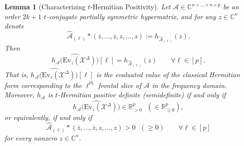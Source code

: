 \documentclass[11pt]{article}
\newtheorem{lemma}[theorem]{Lemma}
\begin{document}
\begin{lemma}[Characterizing $t$-Hermitian Positivity]\label{Characterizing t-Hermitian Positivity}
    Let $\mathcal{A}\in \mathbb{C}^{n\times\dots\times n\times p}$ be an order $2k+1$ $t$-conjugate partially symmetric hypermatrix, and for any $z\in \mathbb{C}^n$ denote 
    \[\widehat{\mathcal{A}}_{(\ell)}*(\overline{z},\dots,\overline{z},z,\dots,z) := h_{\widehat{\mathcal{A}}_{(\ell)}}(z).\]
    Then 
    \[\widehat{h_{\mathcal{A}}\big(\mathrm{Ev}_z(\mathcal{X}^{\Delta})\big)}[\ell] = h_{\widehat{\mathcal{A}}_{(\ell)}}(z)\qquad \forall \ell\in [p].\]
    That is, $\widehat{h_{\mathcal{A}}\big(\mathrm{Ev}_z(\mathcal{X}^{\Delta})\big)}[\ell]$ is the evaluated value of the classical Hermitian form corresponding to the $\ell^{th}$ frontal slice of $\mathcal{A}$ in the frequency domain. Moreover, $h_{\mathcal{A}}$ is $t$-Hermitian positive definite (semidefinite) if and only if  
    \[\widehat{h_{\mathcal{A}}\big(\mathrm{Ev}_z(\mathcal{X}^{\Delta})\big)}\in \mathbb{R}_{>0}^p\text{ }(\in \mathbb{R}_{\geq 0}^p),\]
    or equivalently, if and only if 
    \[\widehat{\mathcal{A}}_{(\ell)}*(\overline{z},\dots,\overline{z},z,\dots,z) > 0\text{ }(\geq 0)\qquad \forall \ell\in [p]\]
    for every nonzero $z\in \mathbb{C}^n$. 
\end{lemma}
\end{document}

